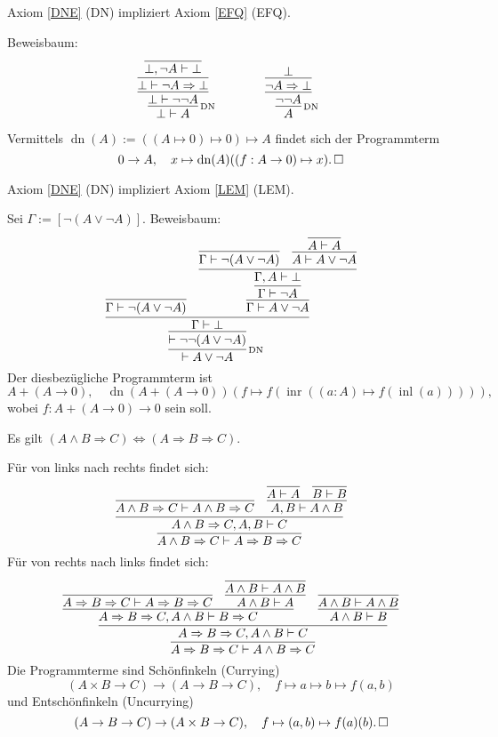 \begin{Satz}
Axiom \ref{DNE} (DN) impliziert
Axiom \ref{EFQ} (EFQ).
\end{Satz}
\begin{Beweis}[Beweis]
Beweisbaum:
\[
\begin{array}{@{}l@{\qquad\qquad}l}
\infer[\infernote{DN}]{\bot\vdash A}{
  \infer{\bot\vdash\neg\neg A}{
    \infer{\bot\vdash \neg A\Rightarrow\bot}{
      \infer{\bot,\neg A\vdash\bot}{}}}}
&
\infer[\infernote{DN}]{A}{
  \infer{\neg\neg A}{
    \infer{\neg A\Rightarrow\bot}{\bot}}}
\end{array}
\]
Vermittels $\operatorname{dn}(A):=((A\mapsto 0)\mapsto 0)\mapsto A$
findet sich der Programmterm
\[0\to A,\quad x\mapsto \operatorname{dn}(A)((f: A\to 0)\mapsto x).
\,\square\]
\end{Beweis}

\begin{Satz}
Axiom \ref{DNE} (DN) impliziert Axiom \ref{LEM} (LEM).
\end{Satz}
\begin{Beweis}[Beweis]
Sei $\Gamma:=[\neg (A\lor\neg A)]$. Beweisbaum:
\[\infer[\infernote{DN}]{\vdash A\lor\neg A}{
  \infer{\vdash\neg\neg (A\lor\neg A)}{
    \infer{\Gamma\vdash\bot}{
      \infer{\Gamma\vdash\neg (A\lor\neg A)}{}
    & \infer{\Gamma\vdash A\lor\neg A}{
        \infer{\Gamma\vdash\neg A}{
          \infer{\Gamma,A\vdash\bot}{
            \infer{\Gamma\vdash\neg (A\lor\neg A)}{}
          & \infer{A\vdash A\lor\neg A}{\infer{A\vdash A}{}}}}}}}}
\]
Der diesbezügliche Programmterm ist
\[A + (A\to 0),\quad
\operatorname{dn}(A + (A\to 0))(
  f\mapsto f(\operatorname{inr}((a: A)\mapsto f(\operatorname{inl}(a))))
),\]
wobei $f\colon A + (A \to 0)\to 0$ sein soll.\,\qedsymbol
\end{Beweis}

\begin{Satz}\label{curry-impl}
Es gilt $(A\land B\Rightarrow C)\Leftrightarrow (A\Rightarrow B\Rightarrow C)$.
\end{Satz}
\begin{Beweis}
Für von links nach rechts findet sich:
\[
\infer{A\land B\Rightarrow C\vdash A\Rightarrow B\Rightarrow C}{
  \infer{A\land B\Rightarrow C, A, B\vdash C}{
    \infer{A\land B\Rightarrow C\vdash A\land B\Rightarrow C}{}
  & \infer{A, B\vdash A\land B}{
      \infer{A\vdash A}{} & \infer{B\vdash B}{}}}}
\]
Für von rechts nach links findet sich:
\[
\infer{A\Rightarrow B\Rightarrow C\vdash A\land B\Rightarrow C}{
  \infer{A\Rightarrow B\Rightarrow C, A\land B\vdash C}{
    \infer{A\Rightarrow B\Rightarrow C, A\land B\vdash B\Rightarrow C}{
      \infer{A\Rightarrow B\Rightarrow C\vdash A\Rightarrow B\Rightarrow C}{}
    & \infer{A\land B\vdash A}{\infer{A\land B\vdash A\land B}{}}}
  & \infer{A\land B\vdash B}{\infer{A\land B\vdash A\land B}{}}}}
\]
Die Programmterme sind Schönfinkeln (Currying)
\[(A\times B\to C)\to (A\to B\to C),\quad
f\mapsto a\mapsto b\mapsto f(a,b)\]
und Entschönfinkeln (Uncurrying)
\[(A\to B\to C)\to (A\times B\to C),\quad
f\mapsto (a, b)\mapsto f(a)(b).\,\square\]
\end{Beweis}

